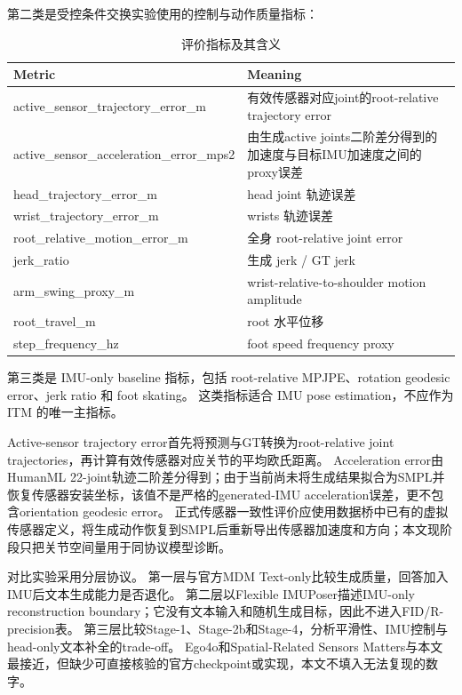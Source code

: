 第二类是受控条件交换实验使用的控制与动作质量指标：

\begin{table}[t]
\centering
\caption{评价指标及其含义}
\label{tab:result-6}
\footnotesize
\setlength{\tabcolsep}{3pt}
\renewcommand{\arraystretch}{1.15}
\begin{tabularx}{\linewidth}{LL}
\toprule
Metric & Meaning \\
\midrule
active\_sensor\_trajectory\_error\_m & 有效传感器对应joint的root-relative trajectory error \\
active\_sensor\_acceleration\_error\_mps2 & 由生成active joints二阶差分得到的加速度与目标IMU加速度之间的proxy误差 \\
head\_trajectory\_error\_m & head joint 轨迹误差 \\
wrist\_trajectory\_error\_m & wrists 轨迹误差 \\
root\_relative\_motion\_error\_m & 全身 root-relative joint error \\
jerk\_ratio & 生成 jerk / GT jerk \\
arm\_swing\_proxy\_m & wrist-relative-to-shoulder motion amplitude \\
root\_travel\_m & root 水平位移 \\
step\_frequency\_hz & foot speed frequency proxy \\
\bottomrule
\end{tabularx}
\end{table}


第三类是 IMU-only baseline 指标，包括 root-relative MPJPE、rotation geodesic error、jerk ratio 和 foot skating。
这类指标适合 IMU pose estimation，不应作为 ITM 的唯一主指标。

Active-sensor trajectory error首先将预测与GT转换为root-relative joint trajectories，再计算有效传感器对应关节的平均欧氏距离。
Acceleration error由HumanML 22-joint轨迹二阶差分得到；由于当前尚未将生成结果拟合为SMPL并恢复传感器安装坐标，该值不是严格的generated-IMU acceleration误差，更不包含orientation geodesic error。
正式传感器一致性评价应使用数据桥中已有的虚拟传感器定义，将生成动作恢复到SMPL后重新导出传感器加速度和方向；本文现阶段只把关节空间量用于同协议模型诊断。

对比实验采用分层协议。
第一层与官方MDM Text-only比较生成质量，回答加入IMU后文本生成能力是否退化。
第二层以Flexible IMUPoser描述IMU-only reconstruction boundary；它没有文本输入和随机生成目标，因此不进入FID/R-precision表。
第三层比较Stage-1、Stage-2b和Stage-4，分析平滑性、IMU控制与head-only文本补全的trade-off。
Ego4o和Spatial-Related Sensors Matters与本文最接近，但缺少可直接核验的官方checkpoint或实现，本文不填入无法复现的数字。

